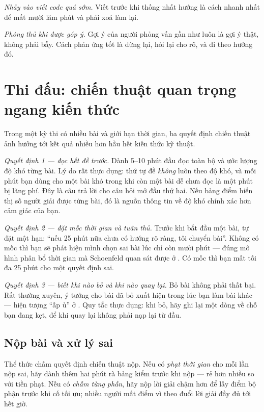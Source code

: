 \documentclass[../../algorithm.tex]{subfiles}
\begin{document}
\emph{Nhảy vào viết code quá sớm.} Viết trước khi thống nhất hướng là cách nhanh nhất để mất mười lăm phút và phải xoá làm lại.

\emph{Phòng thủ khi được góp ý.} Gợi ý của người phỏng vấn gần như luôn là gợi ý thật, không phải bẫy. Cách phản ứng tốt là dừng lại, hỏi lại cho rõ, và đi theo hướng đó.

\section{Thi đấu: chiến thuật quan trọng ngang kiến thức}

Trong một kỳ thi có nhiều bài và giới hạn thời gian, ba quyết định chiến thuật ảnh hưởng tới kết quả nhiều hơn hầu hết kiến thức kỹ thuật.

\emph{Quyết định 1 --- đọc hết đề trước.} Dành 5--10 phút đầu đọc toàn bộ và ước lượng độ khó từng bài. Lý do rất thực dụng: thứ tự đề \emph{không} luôn theo độ khó, và mỗi phút bạn dùng cho một bài khó trong khi còn một bài dễ chưa đọc là một phút bị lãng phí. Đây là câu trả lời cho câu hỏi mở đầu thứ hai. Nếu bảng điểm hiển thị số người giải được từng bài, đó là nguồn thông tin về độ khó chính xác hơn cảm giác của bạn.

\emph{Quyết định 2 --- đặt mốc thời gian và tuân thủ.} Trước khi bắt đầu một bài, tự đặt một hạn: ``nếu 25 phút nữa chưa có hướng rõ ràng, tôi chuyển bài''. Không có mốc thì bạn sẽ phát hiện mình chọn sai bài lúc chỉ còn mười phút --- đúng mô hình phân bổ thời gian mà Schoenfeld quan sát được ở . Có mốc thì bạn mất tối đa 25 phút cho một quyết định sai.

\emph{Quyết định 3 --- biết khi nào bỏ và khi nào quay lại.} Bỏ bài không phải thất bại. Rất thường xuyên, ý tưởng cho bài đã bỏ xuất hiện trong lúc bạn làm bài khác --- hiện tượng ``ấp ủ'' ở . Quy tắc thực dụng: khi bỏ, hãy ghi lại một dòng về chỗ bạn đang kẹt, để khi quay lại không phải nạp lại từ đầu.

\subsection{Nộp bài và xử lý sai}

Thể thức chấm quyết định chiến thuật nộp. Nếu có \emph{phạt thời gian} cho mỗi lần nộp sai, hãy dành thêm hai phút rà bảng kiểm trước khi nộp --- rẻ hơn nhiều so với tiền phạt. Nếu có \emph{chấm từng phần}, hãy nộp lời giải chậm hơn để lấy điểm bộ phận trước khi cố tối ưu; nhiều người mất điểm vì theo đuổi lời giải đầy đủ tới hết giờ.
\end{document}
